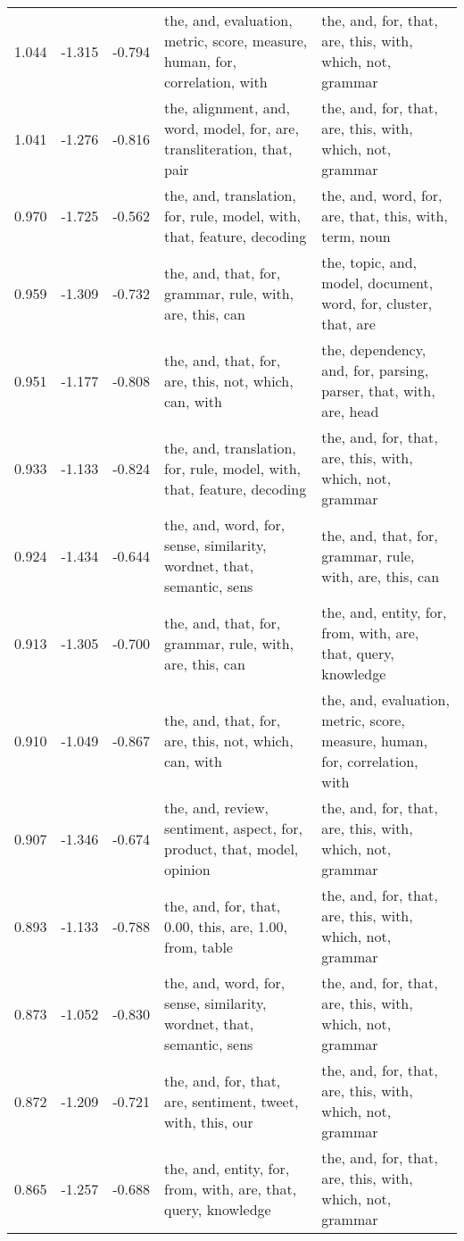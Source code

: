 \begin{tabular}{cccp{5cm}p{5cm}}
1.044 & -1.315 & -0.794 & the, and, evaluation, metric, score, measure, human, for, correlation, with & the, and, for, that, are, this, with, which, not, grammar \\
1.041 & -1.276 & -0.816 & the, alignment, and, word, model, for, are, transliteration, that, pair & the, and, for, that, are, this, with, which, not, grammar \\
0.970 & -1.725 & -0.562 & the, and, translation, for, rule, model, with, that, feature, decoding & the, and, word, for, are, that, this, with, term, noun \\
0.959 & -1.309 & -0.732 & the, and, that, for, grammar, rule, with, are, this, can & the, topic, and, model, document, word, for, cluster, that, are \\
0.951 & -1.177 & -0.808 & the, and, that, for, are, this, not, which, can, with & the, dependency, and, for, parsing, parser, that, with, are, head \\
0.933 & -1.133 & -0.824 & the, and, translation, for, rule, model, with, that, feature, decoding & the, and, for, that, are, this, with, which, not, grammar \\
0.924 & -1.434 & -0.644 & the, and, word, for, sense, similarity, wordnet, that, semantic, sens & the, and, that, for, grammar, rule, with, are, this, can \\
0.913 & -1.305 & -0.700 & the, and, that, for, grammar, rule, with, are, this, can & the, and, entity, for, from, with, are, that, query, knowledge \\
0.910 & -1.049 & -0.867 & the, and, that, for, are, this, not, which, can, with & the, and, evaluation, metric, score, measure, human, for, correlation, with \\
0.907 & -1.346 & -0.674 & the, and, review, sentiment, aspect, for, product, that, model, opinion & the, and, for, that, are, this, with, which, not, grammar \\
0.893 & -1.133 & -0.788 & the, and, for, that, 0.00, this, are, 1.00, from, table & the, and, for, that, are, this, with, which, not, grammar \\
0.873 & -1.052 & -0.830 & the, and, word, for, sense, similarity, wordnet, that, semantic, sens & the, and, for, that, are, this, with, which, not, grammar \\
0.872 & -1.209 & -0.721 & the, and, for, that, are, sentiment, tweet, with, this, our & the, and, for, that, are, this, with, which, not, grammar \\
0.865 & -1.257 & -0.688 & the, and, entity, for, from, with, are, that, query, knowledge & the, and, for, that, are, this, with, which, not, grammar \\

\end{tabular}
